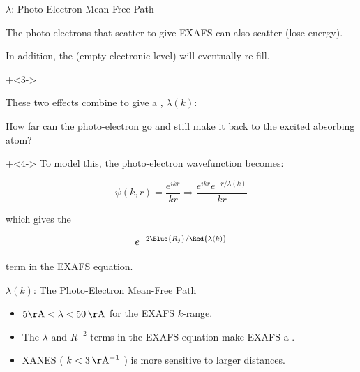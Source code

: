 \begin{slide}{$\lambda$: Photo-Electron Mean Free Path}

  \vmm
    The photo-electrons that scatter to give EXAFS can also scatter
    {} (lose energy).

    \vmm\pause
    In addition, the {} (empty electronic level)
    will eventually re-fill.

    \vmm\onslide+<3->

    These two effects combine to give a {},  ${\lambda(k)}$:

    \vmm
   \begin{postitbox}{66mm}
    How far can the  photo-electron go and still make it back to the
    excited absorbing atom?
   \end{postitbox}

    \vmm\onslide+<4->
    To model this, the photo-electron wavefunction becomes:

    \[ \displaystyle{
        \psi(k,r)  =  {\frac{e^{ikr}}{kr}}
        \Rightarrow   {\frac{e^{ikr}e^{-r/\lambda(k)}}{kr}}
        }
    \]

    which gives the

    \[        e^{-2{\Blue{R_j}}/{\Red{\lambda(k)}}} \]

    term in the EXAFS equation.



\vfill
\end{slide}

 \begin{slide}{${\lambda(k)}$: The Photo-Electron Mean-Free Path}

   \begin{center}
     \end{center}

     \vmm

     \begin{itemize}
       \item ${\rm 5 \AA < \lambda < 50\,\AA}$ for the EXAFS ${k}$-range.

       \item The ${\lambda}$ and ${R^{-2}}$ terms in the EXAFS equation
         make EXAFS a  {}.

       \item  XANES ( $k<3\rm\,\AA^{-1}$ ) is more sensitive to larger
         distances.
       \end{itemize}
\vfill
\end{slide}

